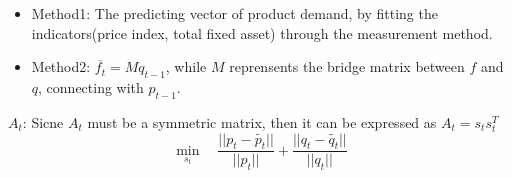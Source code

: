 \documentclass{article}
\theoremstyle{definition}
\theoremstyle{definition}
\theoremstyle{remark}
\begin{document}
\begin{itemize}
\begin{itemize}
			\item Method1: The predicting vector of product demand,
			by fitting the indicators(price index, total fixed asset) 
			through the measurement method. \\
			\item Method2: $\overline{f_t}=Mq_{t-1}$, while $M$ reprensents
			the bridge matrix between $f$ and $q$, connecting with $p_{t-1}$.
		\end{itemize}
		$A_t$: Sicne $A_t$ must be a symmetric matrix, then it can be 
		expressed as $A_t =s_ts_{t}^{T}$
		\begin{equation*}
			\min_{s_t} \quad \frac{||p_t - \tilde{p_t}||}{||p_t||} 
						+\frac{||q_t - \tilde{q_t}||}{||q_t||}
		\end{equation*}
	
\end{itemize}
\end{document}
